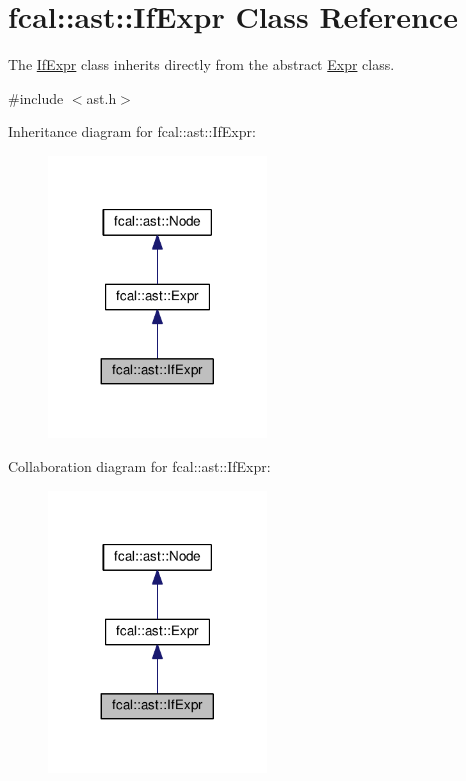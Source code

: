 \hypertarget{classfcal_1_1ast_1_1IfExpr}{}\section{fcal\+:\+:ast\+:\+:If\+Expr Class Reference}
\label{classfcal_1_1ast_1_1IfExpr}


The \hyperlink{classfcal_1_1ast_1_1IfExpr}{If\+Expr} class inherits directly from the abstract \hyperlink{classfcal_1_1ast_1_1Expr}{Expr} class.  




{\ttfamily \#include $<$ast.\+h$>$}



Inheritance diagram for fcal\+:\+:ast\+:\+:If\+Expr\+:\nopagebreak
\begin{figure}[H]
\begin{center}
\leavevmode
\includegraphics[width=164pt]{classfcal_1_1ast_1_1IfExpr__inherit__graph}
\end{center}
\end{figure}


Collaboration diagram for fcal\+:\+:ast\+:\+:If\+Expr\+:\nopagebreak
\begin{figure}[H]
\begin{center}
\leavevmode
\includegraphics[width=164pt]{classfcal_1_1ast_1_1IfExpr__coll__graph}
\end{center}
\end{figure}
